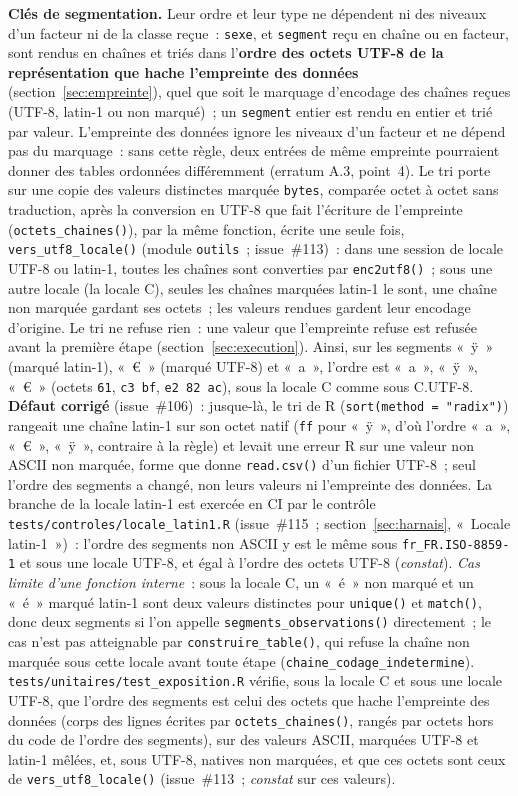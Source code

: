 \documentclass[a4paper,11pt]{article}
\newcommand{\code}[1]{\texttt{\small #1}}
\begin{document}
\medskip
\textbf{Clés de segmentation.} Leur ordre et leur type ne dépendent ni des
niveaux d'un facteur ni de la classe reçue~: \code{sexe}, et \code{segment}
reçu en chaîne ou en facteur, sont rendus en chaînes et triés dans
l'\textbf{ordre des octets UTF-8 de la représentation que hache l'empreinte
des données} (section~\ref{sec:empreinte}), quel que soit le marquage
d'encodage des chaînes reçues (UTF-8, latin-1 ou non marqué)~; un
\code{segment} entier est rendu en entier et trié par valeur.
L'empreinte des données ignore les niveaux d'un facteur et ne dépend pas
du marquage~: sans cette règle, deux entrées de même empreinte pourraient
donner des tables ordonnées différemment (erratum A.3, point~4). Le tri
porte sur une copie des valeurs distinctes marquée \code{bytes}, comparée
octet à octet sans traduction, après la conversion en UTF-8 que fait
l'écriture de l'empreinte (\code{octets\_chaines()}), par la même
fonction, écrite une seule fois, \code{vers\_utf8\_locale()} (module
\code{outils}~; issue~\#113)~: dans une session de
locale UTF-8 ou latin-1, toutes les chaînes sont converties par
\code{enc2utf8()}~; sous une autre locale (la locale C), seules les chaînes
marquées latin-1 le sont, une chaîne non marquée gardant ses octets~; les
valeurs rendues gardent leur encodage d'origine. Le tri ne refuse rien~:
une valeur que l'empreinte refuse est refusée avant la première étape
(section~\ref{sec:execution}). Ainsi, sur les segments
«~ÿ~» (marqué latin-1), «~€~» (marqué UTF-8) et «~a~», l'ordre est
«~a~», «~ÿ~», «~€~» (octets \code{61}, \code{c3 bf}, \code{e2 82 ac}), sous
la locale C comme sous C.UTF-8. \textbf{Défaut corrigé} (issue~\#106)~:
jusque-là, le tri de R (\code{sort(method = "radix")}) rangeait une chaîne
latin-1 sur son octet natif (\code{ff} pour «~ÿ~», d'où l'ordre «~a~»,
«~€~», «~ÿ~», contraire à la règle) et levait une erreur R sur une valeur
non ASCII non marquée, forme que donne \code{read.csv()} d'un fichier UTF-8~;
seul l'ordre des segments a changé, non leurs valeurs ni l'empreinte des
données. La branche de la locale latin-1 est exercée en CI par le contrôle
\code{tests/controles/locale\_latin1.R} (issue~\#115~;
section~\ref{sec:harnais}, «~Locale latin-1~»)~: l'ordre des segments
non ASCII y est le même sous \code{fr\_FR.ISO-8859-1} et sous une locale
UTF-8, et égal à l'ordre des octets UTF-8 (\emph{constat}). \emph{Cas limite d'une fonction interne}~:
sous la locale C, un «~é~» non marqué et un «~é~» marqué latin-1 sont deux
valeurs distinctes pour \code{unique()} et \code{match()}, donc deux
segments si l'on appelle \code{segments\_observations()} directement~; le
cas n'est pas atteignable par \code{construire\_table()}, qui refuse la
chaîne non marquée sous cette locale avant toute étape
(\code{chaine\_codage\_indetermine}). \code{tests/unitaires/test\_exposition.R}
vérifie, sous la locale C et sous une locale UTF-8, que l'ordre des
segments est celui des octets que hache l'empreinte des données (corps des
lignes écrites par \code{octets\_chaines()}, rangés par octets hors du code
de l'ordre des segments), sur des valeurs ASCII, marquées UTF-8 et
latin-1 mêlées, et, sous UTF-8, natives non marquées, et que ces octets
sont ceux de \code{vers\_utf8\_locale()} (issue~\#113~; \emph{constat}
sur ces valeurs).
\end{document}
